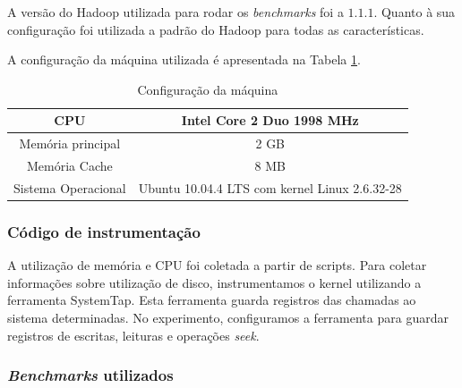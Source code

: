 \documentclass[a4paper,10pt]{article}
\begin{document}
A versão do Hadoop utilizada para rodar os \textit{benchmarks} foi a $1.1.1$.
Quanto à sua configuração foi utilizada a padrão do Hadoop para todas as
características.

A configuração da máquina utilizada é apresentada na Tabela
\ref{machine_configuration}.

\begin{table}[htp]
   \centering
   \caption{Configuração da máquina} 
   \label{machine_configuration}
   \begin{tabular}{|c|c|}
      \hline
      CPU & Intel Core 2 Duo 1998 MHz \\
      \hline
      Memória principal & 2 GB \\
      \hline
      Memória Cache & 8 MB \\
      \hline
      Sistema Operacional & Ubuntu 10.04.4 LTS com kernel Linux 2.6.32-28 \\
      \hline
   \end{tabular}
\end{table}

\subsubsection{Código de instrumentação}
A utilização de memória e CPU foi coletada a partir de scripts. Para coletar
informações sobre utilização de disco, instrumentamos o kernel utilizando a
ferramenta SystemTap\cite{systemtap_site}. Esta ferramenta guarda
registros das chamadas ao sistema determinadas. No experimento, configuramos a
ferramenta para guardar registros de escritas, leituras e operações
\textit{seek}.

\subsubsection{\textit{Benchmarks} utilizados}
\end{document}
